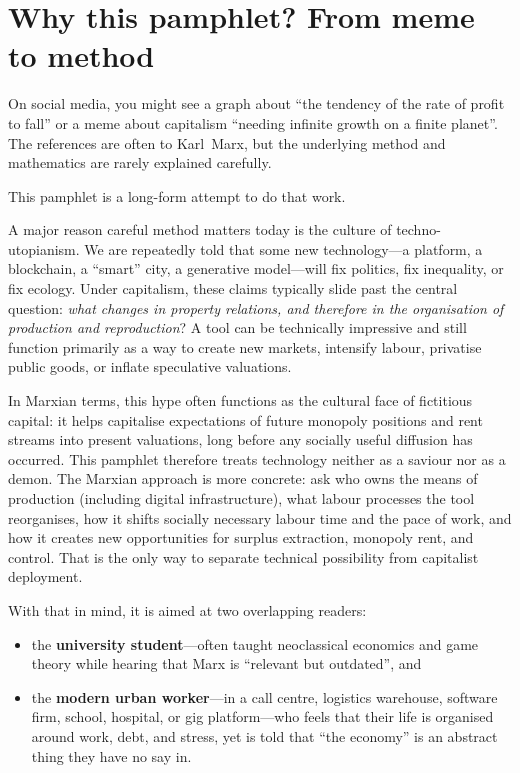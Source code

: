 
\section{Why this pamphlet? From meme to method}
\label{sec:intro-meme-method}

On social media, you might see a graph about ``the tendency of the rate of
profit to fall'' or a meme about capitalism ``needing infinite growth on a
finite planet''. The references are often to Karl~Marx, but the underlying
method and mathematics are rarely explained carefully.

This pamphlet is a long-form attempt to do that work.

A major reason careful method matters today is the culture of techno-utopianism.
We are repeatedly told that some new technology---a platform, a blockchain, a ``smart'' city,
a generative model---will fix politics, fix inequality, or fix ecology. Under capitalism,
these claims typically slide past the central question: \emph{what changes in property relations,
and therefore in the organisation of production and reproduction}? A tool can be technically impressive
and still function primarily as a way to create new markets, intensify labour, privatise public goods,
or inflate speculative valuations.

In Marxian terms, this hype often functions as the cultural face of fictitious capital: it helps capitalise expectations of future monopoly positions and rent streams into present valuations, long before any socially useful diffusion has occurred. This pamphlet therefore treats technology neither as a saviour nor as a demon. The Marxian approach is
more concrete: ask who owns the means of production (including digital infrastructure), what labour processes
the tool reorganises, how it shifts socially necessary labour time and the pace of work, and how it creates
new opportunities for surplus extraction, monopoly rent, and control. That is the only way to separate
technical possibility from capitalist deployment.

With that in mind, it is aimed at two overlapping readers:


\begin{itemize}[leftmargin=1.5em]
  \item the \textbf{university student}---often taught neoclassical economics
  and game theory while hearing that Marx is ``relevant but outdated'', and

  \item the \textbf{modern urban worker}---in a call centre, logistics
  warehouse, software firm, school, hospital, or gig platform---who feels
  that their life is organised around work, debt, and stress, yet is told
  that ``the economy'' is an abstract thing they have no say in.
\end{itemize}

